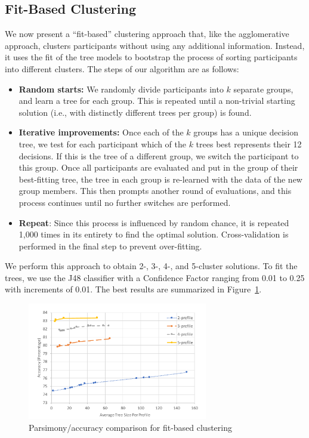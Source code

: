 \subsection{Fit-Based Clustering}
We now present a ``fit-based'' clustering approach that, like the agglomerative approach, clusters participants without using any additional information. Instead, it uses the fit of the tree models to bootstrap the process of sorting participants into different clusters. The steps of our algorithm are as follows:
\begin{itemize}
	\item \textbf{Random starts:} We randomly divide participants into $k$ separate groups, and learn a tree for each group. This is repeated until a non-trivial starting solution (i.e., with distinctly different trees per group) is found. 
	
	\item \textbf{Iterative improvements:} Once each of the $k$ groups has a unique decision tree, we test for each participant which of the $k$ trees best represents their 12 decisions. If this is the tree of a different group, we switch the participant to this group. Once all participants are evaluated and put in the group of their best-fitting tree, the tree in each group is re-learned with the data of the new group members. This then prompts another round of evaluations, and this process continues until no further switches are performed.
	
	\item \textbf{Repeat}: Since this process is influenced by random chance, it is repeated 1,000 times in its entirety to find the optimal solution. Cross-validation is performed in the final step to prevent over-fitting.
\end{itemize}

We perform this approach to obtain 2-, 3-, 4-, and 5-cluster solutions. To fit the trees, we use the J48 classifier with a Confidence Factor ranging from 0.01 to 0.25 with increments of 0.01. The best results are summarized in Figure~\ref{fig:fitsum}.

\begin{figure}
	\centering
	\includegraphics[width=0.7\textwidth]{figures/fitSum.pdf}
	\caption{Parsimony/accuracy comparison for fit-based clustering}
	\label{fig:fitsum}
\end{figure}

